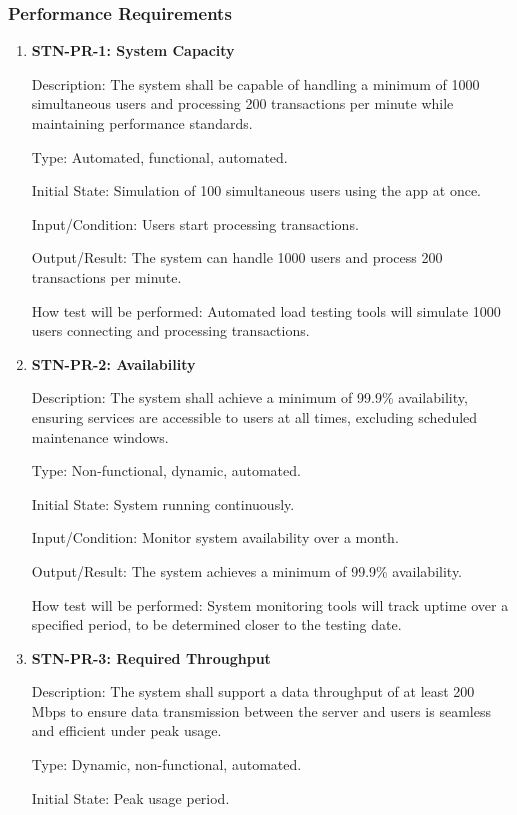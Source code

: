 \documentclass[12pt, titlepage]{article}
\begin{document}
\subsubsection{Performance Requirements}

\begin{enumerate}
\item {\textbf{STN-PR-1: System Capacity}}

Description: The system shall be capable of handling a minimum of 1000 simultaneous users and processing 200 transactions per minute while maintaining performance standards.

Type: Automated, functional, automated.

Initial State: Simulation of 100 simultaneous users using the app at once. 

Input/Condition: Users start processing transactions.

Output/Result: The system can handle 1000 users and process 200 transactions per minute.

How test will be performed: Automated load testing tools will simulate 1000 users connecting and processing transactions.


\item{\textbf{STN-PR-2: Availability}}

Description: The system shall achieve a minimum of 99.9\% availability, ensuring services are accessible to users at all times, excluding scheduled maintenance windows.

Type: Non-functional, dynamic, automated.

Initial State: System running continuously.

Input/Condition: Monitor system availability over a month.

Output/Result: The system achieves a minimum of 99.9\% availability.

How test will be performed: System monitoring tools will track uptime over a specified period, to be determined closer to the testing date. 

\item{\textbf{STN-PR-3: Required Throughput}}

Description: The system shall support a data throughput of at least 200 Mbps to ensure data transmission between the server and users is seamless and efficient under peak usage.

Type: Dynamic, non-functional, automated.

Initial State: Peak usage period.


\end{enumerate}
\end{document}
